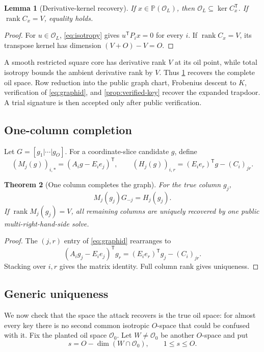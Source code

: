 \documentclass[10pt,a4paper]{article}
\newtheorem{theorem}{Theorem}[section]
\newtheorem{lemma}[theorem]{Lemma}
\newcommand{\PP}{\mathbb P}
\newcommand{\cO}{\mathcal O}
\newcommand{\rank}{\operatorname{rank}}
\newcommand{\trans}{\mathsf T}
\begin{document}
\begin{lemma}[Derivative-kernel recovery]\label{lem:kernel}
If $x\in\PP(\cO_L)$, then $\cO_L\subseteq\ker C_x^{\trans}$. If $\rank C_x=V$, equality holds.
\end{lemma}

\begin{proof}
For $u\in\cO_L$, \eqref{eq:isotropy} gives $u^{\trans}P_ix=0$ for every $i$. If $\rank C_x=V$, its transpose kernel has dimension $(V+O)-V=O$.
\end{proof}

A smooth restricted square core has derivative rank $V$ at its oil point, while total isotropy bounds the ambient derivative rank by $V$. Thus \cref{lem:kernel} recovers the complete oil space. Row reduction into the public graph chart, Frobenius descent to $K$, verification of \eqref{eq:graphid}, and \cref{prop:verified-key} recover the expanded trapdoor.  A trial signature is then accepted only after public verification.

\subsection{One-column completion}

Let $G=[g_1|\cdots|g_O]$. For a coordinate-slice candidate $g$, define
\[
(M_j(g))_{i,*}=(A_ig-E_ie_j)^{\trans},
\qquad
(H_j(g))_{i,r}=(E_ie_r)^{\trans}g-(C_i)_{jr}.
\]

\begin{theorem}[One column completes the graph]\label{thm:completion}
For the true column $g_j$,
\[
M_j(g_j)G_{-j}=H_j(g_j).
\]
If $\rank M_j(g_j)=V$, all remaining columns are uniquely recovered by one public multi-right-hand-side solve.
\end{theorem}

\begin{proof}
The $(j,r)$ entry of \eqref{eq:graphid} rearranges to
\[
(A_ig_j-E_ie_j)^{\trans}g_r=(E_ie_r)^{\trans}g_j-(C_i)_{jr}.
\]
Stacking over $i,r$ gives the matrix identity. Full column rank gives uniqueness.
\end{proof}

\subsection{Generic uniqueness}

We now check that the space the attack recovers is the true oil space: for almost every key there is no second common isotropic $O$-space that could be confused with it. Fix the planted oil space $\cO_0$.  Let $W\ne\cO_0$ be another $O$-space and put
\[
s=O-\dim(W\cap\cO_0),\qquad 1\le s\le O.
\]
\end{document}
